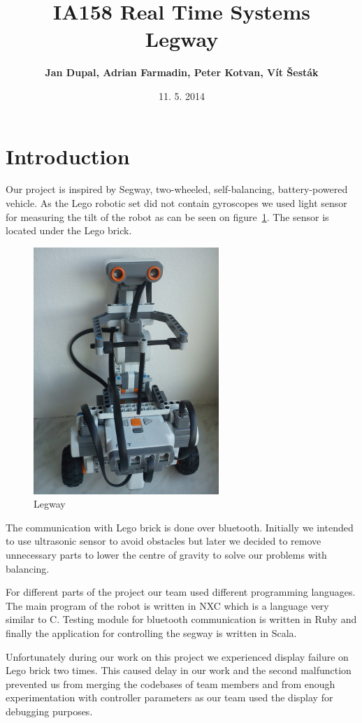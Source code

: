 \documentclass{article}
\title{
\textmd{IA158 Real Time Systems}\\
\textmd{\textbf{Legway}}
}
\author{\textbf{Jan Dupal, Adrian Farmadin, Peter Kotvan, Vít Šesták}}
\date{11. 5. 2014} %
\begin{document}
\maketitle

\section{Introduction}

Our project is inspired by Segway, two-wheeled, self-balancing, battery-powered
vehicle. \cite{segway} \cite{wseg} As the Lego robotic set did not contain
gyroscopes we used light sensor for measuring the tilt of the robot as can be
seen on figure~\ref{fig:legway}. The sensor is located under the Lego brick.

\begin{figure}[h]
    \centering
    \includegraphics[width=7cm, angle=270]{legway}
    \caption{Legway}
    \label{fig:legway}
\end{figure}

The communication with Lego brick is done over bluetooth. Initially we intended
to use ultrasonic sensor to avoid obstacles but later we decided to remove
unnecessary parts to lower the centre of gravity to solve our problems with
balancing.

For different parts of the project our team used different programming
languages. The main program of the robot is written in NXC \cite{nxc} which is a
language very similar to C. Testing module for bluetooth communication is
written in Ruby and finally the application for controlling the segway is
written in Scala.

Unfortunately during our work on this project we experienced display failure on
Lego brick two times. This caused delay in our work and the second malfunction
prevented us from merging the codebases of team members and from enough
experimentation with controller parameters as our team used the display for
debugging purposes.
\end{document}
